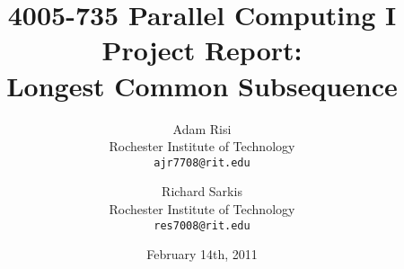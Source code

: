 \documentclass[12pt]{report}
\title{4005-735 Parallel Computing I \\ Project Report: \\  Longest Common Subsequence}
\author{Adam Risi \\ Rochester Institute of Technology \\ \texttt{ajr7708@rit.edu} \and Richard Sarkis \\ Rochester Institute of Technology \\  \texttt{res7008@rit.edu}}
\date{February 14th, 2011}
\begin{document}
\maketitle















\nocite{BenMabrouk:2010p429,Liu:2007p402}
\nocite{JinxianLin:2010p424,Rashid:2007p409}




\end{document}
